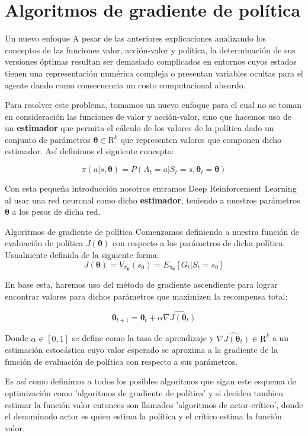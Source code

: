 \documentclass[10pt]{beamer}
\begin{document}
	\section{Algoritmos de gradiente de política}
		\begin{frame}{Un nuevo enfoque}
			A pesar de las anteriores explicaciones analizando los conceptos de las funciones valor, acción-valor y política, la determinación de 
			sus versiones óptimas resultan ser demasiado complicados en entornos cuyos estados tienen una representación numérica compleja o presentan
			variables ocultas para el agente dando como consecuencia un costo computacional absurdo.
			\vspace{0.3 cm}
			
			Para resolver este problema, tomamos un nuevo enfoque para el cual no se toman en consideración las funciones de valor y acción-valor, sino que hacemos
			uso de un \textbf{estimador} que permita el cálculo de los valores de la política dado un conjunto de parámetros $\boldsymbol{\theta} \in \mathrm{R}^k$ que representen valores que componen dicho estimador. Así definimos
			el siguiente concepto:
			
			\[
			\pi(a | s, \boldsymbol{\theta}) = P(A_t = a | S_t = s, \boldsymbol{\theta}_t = \boldsymbol{\theta})
			\]

			Con esta pequeña introducción nosotros entramos Deep Reinforcement Learning al usar una red neuronal como dicho \textbf{estimador}, teniendo a nuestros parámetros
			$\boldsymbol{\theta}$ a los pesos de dicha red.
		\end{frame}
		
		\begin{frame}{Algoritmos de gradiente de política}
			Comenzamos definiendo a nuestra función de evaluación de política $J(\boldsymbol{\theta})$ con respecto a los parámetros de dicha política. Usualmente definida de la siguiente forma:
			\[
			J(\boldsymbol{\theta}) = V_{\pi_{\boldsymbol{\theta}}} (s_0) = E_{\pi_{\boldsymbol{\theta}}} \left[G_t | S_t = s_0\right]
			\]

			En base esta, haremos uso del método de gradiente ascendiente para lograr encontrar valores para dichos parámetros que maximizen la recompensa total:

			\[
			\boldsymbol{\theta}_{t+1} = \boldsymbol{\theta}_t + \alpha \widehat{\nabla J(\boldsymbol{\theta}_t)} 
			\]

			Donde $\alpha \in \left[0, 1\right]$ se define como la tasa de aprendizaje y $\widehat{\nabla J(\boldsymbol{\theta}_t)} \in \mathrm{R}^k$ a un estimación estocástica cuyo valor esperado se aproxima
			a la gradiente de la función de evaluación de política con respecto a sus parámetros.
			\vspace{0.3 cm}
			
			Es así como definimos a todos los posibles algoritmos que sigan este esquema de optimización como 'algoritmos de gradiente de política' y si 
			deciden tambien estimar la función valor entonces son llamados 'algoritmos de actor-crítico', donde el denominado actor es quien estima la política
			y el crítico estima la función valor.
		\end{frame}
\end{document}
